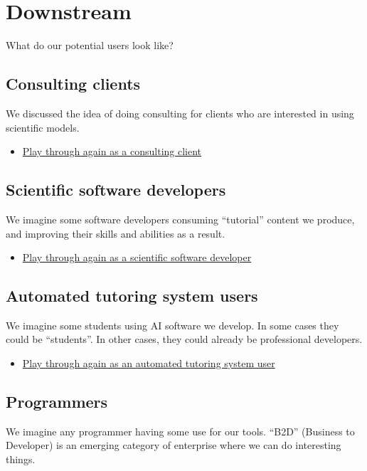 \documentclass[11pt]{article}
\begin{document}
\section{Downstream}
\label{sec:orgfaad489}
What do our potential users look like?

\subsection{Consulting clients}
\label{sec:orga78c787}
We discussed the idea of doing consulting for clients who are
interested in using scientific models.

\begin{itemize}
\item \href{0caba40b-2561-4143-b2b1-55f3ddc3201b}{Play through again as a consulting client}
\end{itemize}
\subsection{Scientific software developers}
\label{sec:org8d5b72b}
We imagine some software developers consuming “tutorial” content we
produce, and improving their skills and abilities as a result.

\begin{itemize}
\item \href{0caba40b-2561-4143-b2b1-55f3ddc3201b}{Play through again as a scientific software developer}
\end{itemize}
\subsection{Automated tutoring system users}
\label{sec:orgc0ea123}
We imagine some students using AI software we develop.  In some cases
they could be “students”.  In other cases, they could already be
professional developers.

\begin{itemize}
\item \href{0caba40b-2561-4143-b2b1-55f3ddc3201b}{Play through again as an automated tutoring system user}
\end{itemize}
\subsection{Programmers}
\label{sec:orgd211db5}
We imagine any programmer having some use for our tools.  “B2D”
(Business to Developer) is an emerging category of enterprise where we
can do interesting things.
\end{document}
